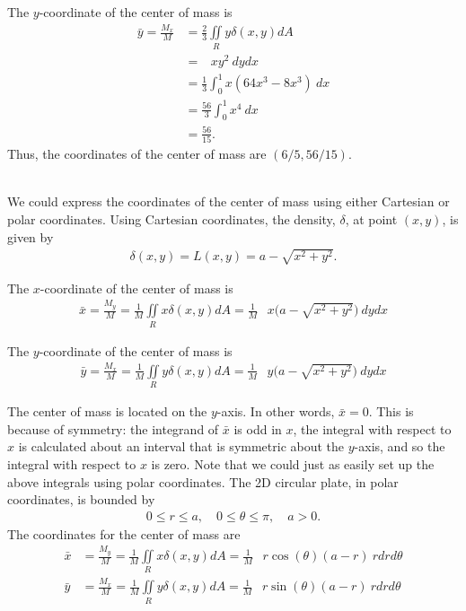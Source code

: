 The $y$-coordinate of the center of mass is
\begin{align*}
  \bar{y} = \frac{M_x}{M} 
  &= \frac{2}{3} \iint\limits_R y \delta(x,y) dA \\
  &=    \mathop{\int_0^1 \!\! \int_{2x}^{4x} } xy^2 \ dydx \\
  &=  \frac{1}{3}  \int_0^1 x(64x^3 - 8x^3) \ dx \\
  &=  \frac{56}{3}  \int_0^1 x^4 \ dx \\
  &=   \frac{56}{15}.
\end{align*}
Thus, the coordinates of the center of mass are $(6/5,56/15)$.
\item %
 \\
We could express the coordinates of the center of mass using either Cartesian or polar coordinates. Using Cartesian coordinates, the density, $\delta$, at point $(x,y)$, is given by
\begin{align*}
  \delta(x,y) = L(x,y) = a - \sqrt{x^2+y^2}.
\end{align*}
\BEN
\item
The $x$-coordinate of the center of mass is
\begin{align*}
  \bar{x} = \frac{M_y}{M} 
  = \frac{1}{M} \iint\limits_R x \delta(x,y) dA 
  = \frac{1}{M}  \mathop{\int_{-a}^{a} \!\! \int_{0}^{\sqrt{x^2+y^2}}} x\Big( a - \sqrt{x^2+y^2}\Big) \ dydx 
\end{align*}
\item
The $y$-coordinate of the center of mass is
\begin{align*}
  \bar{y} = \frac{M_x}{M} 
  = \frac{1}{M} \iint\limits_R y \delta(x,y) dA 
  = \frac{1}{M}  \mathop{\int_{-a}^{a} \!\! \int_{0}^{\sqrt{x^2+y^2}}} y\Big( a - \sqrt{x^2+y^2}\Big) \ dydx 
\end{align*}
\item The center of mass is located on the $y$-axis. In other words, $\bar{x}=0$. This is because of symmetry: the integrand of $\bar{x}$ is odd in $x$, the integral with respect to $x$ is calculated about an interval that is symmetric about the $y$-axis, and so the integral with respect to $x$ is zero. 
\EEN
Note that we could just as easily set up the above integrals using polar coordinates. The 2D circular plate, in polar coordinates, is bounded by 
\begin{align*}
  0 \le r \le a, \quad 0 \le \theta \le \pi, \quad a > 0.
\end{align*}
The coordinates for the center of mass are
\begin{align*}
  \bar{x} &= \frac{M_y}{M} 
  = \frac{1}{M} \iint\limits_R x \delta(x,y) dA 
  = \frac{1}{M}  \mathop{\int_{0}^{\pi} \!\! \int_{0}^r} r\cos(\theta) ( a - r ) \ rdrd\theta \\
  \bar{y} &= \frac{M_x}{M} 
  = \frac{1}{M} \iint\limits_R y \delta(x,y) dA 
  = \frac{1}{M}  \mathop{\int_{0}^{\pi} \!\! \int_{0}^r} r\sin(\theta) ( a -r ) \ rdrd\theta
\end{align*}
 
